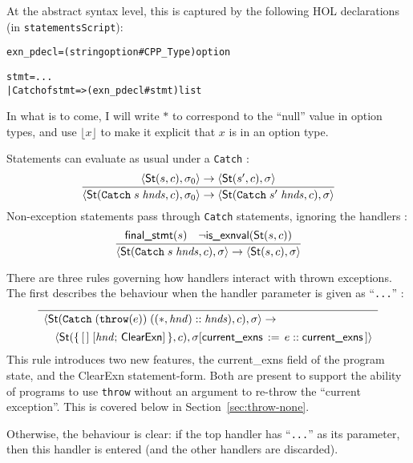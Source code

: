 \documentclass[11pt]{article}
\begin{document}
At the abstract syntax level, this is captured by the following HOL
declarations (in \texttt{statementsScript}):
\begin{alltt}
   exn_pdecl = (string option # CPP_Type) option

   stmt = ...
        | Catch of stmt => (exn_pdecl # stmt) list
\end{alltt}
In what is to come, I will write $*$ to correspond to the ``null''
value in option types, and use $\lfloor x\rfloor$ to make it explicit
that $x$ is in an option type.

\bigskip
\noindent
Statements can evaluate as usual under a \texttt{Catch}
:
\[
\infer{
  \statebrack{\textsf{St}(\texttt{Catch}\;s\;\mathit{hnds}, c),
    \sigma_0}
  \to
  \statebrack{\textsf{St}(\texttt{Catch}\;s'\;\mathit{hnds}, c),
    \sigma}
}{
  \statebrack{\textsf{St}(s,c),\sigma_0}\to
  \statebrack{\textsf{St}(s',c),\sigma}
}
\]
Non-exception statements pass through \texttt{Catch} statements,
ignoring the handlers :
\[
\infer{
  \statebrack{
    \textsf{St}(\texttt{Catch}\;s\;\mathit{hnds}, c),
    \sigma
  }
  \to
  \statebrack{\textsf{St}(s,c), \sigma}
}{
  \textsf{final\_stmt}(s) &
  \lnot\textsf{is\_exnval}(\textsf{St}(s,c))
}
\]

There are three rules governing how handlers interact with thrown
exceptions.  The first describes the behaviour when the handler
parameter is given as ``\texttt{...}'' :
\[
\infer{
  \begin{array}{l}
    \statebrack{
      \textsf{St}(\texttt{Catch}\;(\texttt{throw}(e))\;((*,
      \mathit{hnd})::\mathit{hnds}), c), \sigma
    }
    \to\\[1ex]
    \quad \statebrack{
      \textsf{St}(\mathbf{\{}\,[\,]\;[\mathit{hnd};\,\textsf{ClearExn}]\,\mathbf{\}}, c),
      \sigma[\textsf{current\_exns}\,:=\,e::\textsf{current\_exns}\,]
    }
  \end{array}
}{
}
\]
This rule introduces two new features, the \textsf{current\_exns}
field of the program state, and the \textsf{ClearExn} statement-form.
Both are present to support the ability of programs to use
\texttt{throw} without an argument to re-throw the ``current
exception''.  This is covered below in Section~\ref{sec:throw-none}.

Otherwise, the behaviour is clear: if the top handler has
``\texttt{...}'' as its parameter, then this handler is entered (and
the other handlers are discarded).
\end{document}
